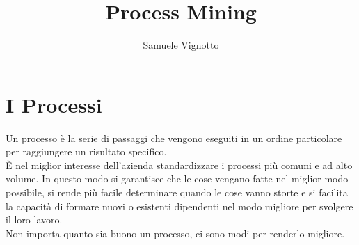 \documentclass{article}
\title{\Huge{\textbf{Process Mining}}\vspace{-1em}}
\author{Samuele Vignotto}
\date{}
\begin{document}
\maketitle

\newpage
\tableofcontents
\newpage

\section{I Processi}
Un processo è la serie di passaggi che vengono eseguiti in un ordine particolare per raggiungere un risultato specifico.\\
È nel miglior interesse dell'azienda standardizzare i processi più comuni e ad alto volume. In questo modo si garantisce che le cose vengano fatte nel miglior modo possibile, si rende più facile determinare quando le cose vanno storte e si facilita la capacità di formare nuovi o esistenti dipendenti nel modo migliore per svolgere il loro lavoro.\\
Non importa quanto sia buono un processo, ci sono modi per renderlo migliore.\\
\end{document}
